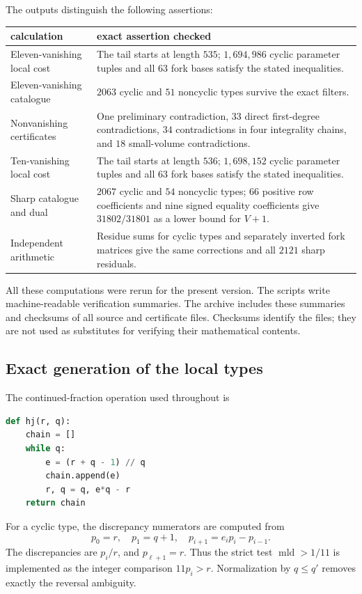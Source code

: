 \documentclass[12pt,a4paper]{article}
\numberwithin{equation}{section}
\theoremstyle{definition}
\newcommand{\mld}{\operatorname{mld}}
\begin{document}
The outputs distinguish the following assertions:
\begin{center}\small
\begin{tabular}{p{41mm}|p{93mm}}
\toprule
calculation&exact assertion checked\\
\midrule
Eleven-vanishing local cost&
The tail starts at length \(535\);
\(1,694,986\) cyclic parameter tuples and all \(63\) fork bases
satisfy the stated inequalities.\\
Eleven-vanishing catalogue&
\(2063\) cyclic and \(51\) noncyclic types survive the exact filters.\\
Nonvanishing certificates&
One preliminary contradiction, \(33\) direct first-degree
contradictions, \(34\) contradictions in four integrality chains,
and \(18\) small-volume contradictions.\\
Ten-vanishing local cost&
The tail starts at length \(536\);
\(1,698,152\) cyclic parameter tuples and all \(63\) fork bases
satisfy the stated inequalities.\\
Sharp catalogue and dual&
\(2067\) cyclic and \(54\) noncyclic types; \(66\) positive row
coefficients and nine signed equality coefficients give
\(31802/31801\) as a lower bound for \(V+1\).\\
Independent arithmetic&
Residue sums for cyclic types and separately inverted fork matrices
give the same corrections and all \(2121\) sharp residuals.\\
\bottomrule
\end{tabular}
\end{center}

All these computations were rerun for the present version.
The scripts write machine-readable verification summaries.
The archive includes these summaries and checksums of all source
and certificate files. Checksums identify the files; they are not
used as substitutes for verifying their mathematical contents.

\subsection{Exact generation of the local types}

The continued-fraction operation used throughout is
\begin{lstlisting}[language=Python]
def hj(r, q):
    chain = []
    while q:
        e = (r + q - 1) // q
        chain.append(e)
        r, q = q, e*q - r
    return chain
\end{lstlisting}
For a cyclic type, the discrepancy numerators are computed from
\[
                p_0=r,\quad p_1=q+1,\quad
                p_{i+1}=e_ip_i-p_{i-1}.
\]
The discrepancies are \(p_i/r\), and \(p_{\ell+1}=r\).
Thus the strict test \(\mld>1/11\) is implemented as the integer
comparison \(11p_i>r\).
Normalization by \(q\leq q'\) removes exactly the reversal ambiguity.
\end{document}
